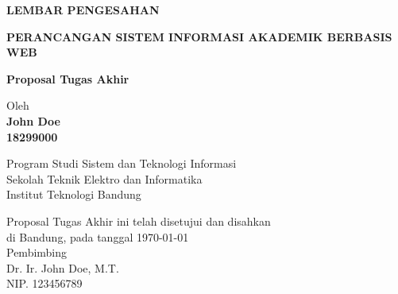 \documentclass[12pt,a4paper,oneside]{book}
\begin{document}
\newpage
\thispagestyle{empty}
\begin{center}
  \textbf{\large LEMBAR PENGESAHAN}\\[1cm]
  \vspace*{1.5cm}
    
  {\large\bfseries PERANCANGAN SISTEM INFORMASI AKADEMIK BERBASIS WEB}\\
     \vspace{2cm}

  {\Large \textbf{Proposal Tugas Akhir}}\\


  \vspace{1.5cm}
    
    
  {\large Oleh}\\[0.3cm]
    \textbf{
    {\large John Doe}\\
    {\large 18299000}
  }\\
    
  \vspace{0.5cm}
 
  {\large Program Studi Sistem dan Teknologi Informasi}\\
  {\large Sekolah Teknik Elektro dan Informatika}\\
  {\large Institut Teknologi Bandung}\\

  \vspace{1.5cm}

  Proposal Tugas Akhir ini telah disetujui dan disahkan\\ 
  di Bandung, pada tanggal \today\\[1cm]

	Pembimbing  \\[3cm]
	Dr. Ir. John Doe, M.T.   \\[0.2cm]
	NIP. 123456789 

\end{center}

\vspace{1cm}
\noindent

\end{document}
